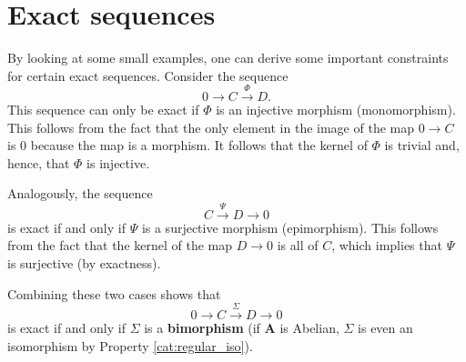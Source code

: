 \section{Exact sequences}


	\begin{property}
		By looking at some small examples, one can derive some important constraints for certain exact sequences. Consider the sequence \[0\longrightarrow C\overset{\Phi}{\longrightarrow}D.\] This sequence can only be exact if $\Phi$ is an injective morphism (monomorphism). This follows from the fact that the only element in the image of the map $0\rightarrow C$ is 0 because the map is a morphism. It follows that the kernel of $\Phi$ is trivial and, hence, that $\Phi$ is injective.

		Analogously, the sequence \[C\overset{\Psi}{\longrightarrow}D\longrightarrow0\] is exact if and only if $\Psi$ is a surjective morphism (epimorphism). This follows from the fact that the kernel of the map $D\rightarrow0$ is all of $C$, which implies that $\Psi$ is surjective (by exactness).

		Combining these two cases shows that \[0\longrightarrow C\overset{\Sigma}{\longrightarrow}D\longrightarrow0\] is exact if and only if $\Sigma$ is a \textbf{bimorphism} (if $\mathbf{A}$ is Abelian, $\Sigma$ is even an isomorphism by Property \ref{cat:regular_iso}).
	\end{property}

